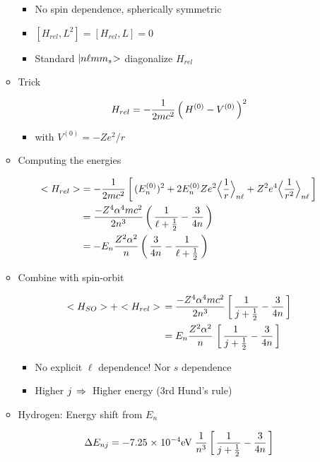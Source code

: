 \documentclass[12pt,letterpaper]{article}
\begin{document}
\begin{Aenumerate}
\begin{itemize}
\begin{itemize}
		\begin{itemize}
		\item No spin dependence, spherically symmetric
		\item $[H_{rel}, L^2] = [H_{rel}, L] = 0$
		\item Standard ${|n \ell m m_s\negmedspace>}$ diagonalize $H_{rel}$
		\end{itemize}

	\item Trick

\begin{equation*}
H_{rel} = -\frac{1}{2mc^2} \left ( \, H^{(0)} - V^{(0)} \, \right )^2
\end{equation*}

	\begin{itemize}
	\item with $V^{(0)} = -Z e^2/r$
	\end{itemize}
 
	\item Computing the energies

\begin{align}
<H_{rel}> &= -\frac{1}{2mc^2} \left [ \, (E_n^{(0)})^2 + 2 E_n^{(0)} Ze^2 
   \Big<\frac{1}{r}\Big>_{n\ell} + Z^2 e^4 \Big<\frac{1}{r^2}\Big>_{n \ell} \, \right ] \\
  &= \frac{-Z^4 \alpha^4 m c^2}{2 n^3} \left ( \, \frac{1}{\ell + \frac{1}{2}} - \frac{3}{4n} \, \right ) \\
  &= -E_n \frac{Z^2 \alpha^2}{n} \left ( \, \frac{3}{4n} - \frac{1}{\ell + \frac{1}{2}} \, \right )
\end{align}


	\item Combine with spin-orbit

\begin{align}
<H_{SO}> + <H_{rel}> \, &= \frac{-Z^4 \alpha^4 m c^2}{2 n^3}
   \left [ \, \frac{1}{j+\frac{1}{2}} - \frac{3}{4n} \, \right ] \\
   &= E_n \frac{Z^2 \alpha^2}{n} \, \left [ \, \frac{1}{j+\frac{1}{2}} - \frac{3}{4n} \, \right ]
\end{align}

		\begin{itemize}
		\item No explicit $\ell$ dependence! Nor $s$ dependence
		\item Higher $j \, \Rightarrow \>$ Higher energy (3rd Hund's rule)
		\end{itemize}

	\item Hydrogen: Energy shift from $E_n$ 

\begin{equation*}
\Delta E_{nj} = -7.25 {\; \times \; 10^{-4}} {\rm eV} \; \frac{1}{n^3} 
   \left [ \, \frac{1}{j+\frac{1}{2}} - \frac{3}{4n} \, \right ]
\end{equation*}


\end{itemize}
\end{itemize}
\end{Aenumerate}
\end{document}
